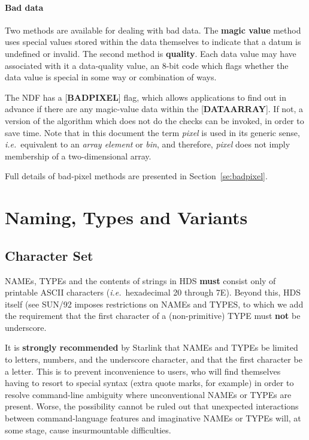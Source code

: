\documentclass[twoside,11pt]{article}
\newcommand{\htmlref}[2]{#1}
\newcommand{\html}[1]{}
\newcommand{\latex}[1]{#1}
\newcommand{\xref}[3]{#1}
\newcommand{\xlabel}[1]{}
\renewcommand{\_}{\texttt{\symbol{95}}}
\begin{document}
\paragraph{Bad data}
Two methods are available for dealing with bad data.  The
{\bf magic value} method uses special values
stored within the data themselves to
indicate that a datum is undefined or invalid.  The second method is
{\bf quality}.  Each data value may have associated with
it a data-quality value, an 8-bit
code which flags whether the data value is special
in some way or combination of ways.

The NDF has a {[}{\bf BAD\_PIXEL}{]} flag, which allows applications
to find out in advance if there are any
magic-value data within the {[}{\bf DATA\_ARRAY}{]}.  If not, a
version of the algorithm which does not do the checks can be
invoked, in order to save time.  Note that in this document the term
{\em pixel} is used in its generic sense, {\it i.e.}\ equivalent to
an {\em array element} or {\em bin}, and therefore, {\em pixel}
does not imply membership of a two-dimensional array.

Full details of bad-pixel methods are presented \latex{in 
Section~\ref{se:badpixel}.}\html{\htmlref{here.}{se:badpixel}}

\section{\xlabel{se_natyvar}Naming, Types and
Variants\label{se:natyvar}}

\subsection{\xlabel{se_charset}Character Set\label{se:charset}}

NAMEs, TYPEs and the contents of strings in HDS
{\bf must} consist only of
printable ASCII characters ({\it i.e.}\ hexadecimal
20 through 7E).  Beyond this, HDS itself
(see \xref{SUN/92}{sun92}) imposes restrictions on NAMEs and TYPES,
to which we add the
requirement that the first character of a
(non-primitive) TYPE must {\bf not} be
underscore.

It is {\bf strongly recommended} by Starlink that NAMEs and TYPEs
be limited to letters, numbers, and the underscore character, and
that the first character be a letter.  This is to
prevent inconvenience
to users, who will find themselves having to resort
to special syntax (extra quote marks, for example) in order to
resolve
command-line ambiguity where unconventional NAMEs or TYPEs are
present.  Worse, the possibility cannot be ruled out that
unexpected interactions
between command-language features and imaginative NAMEs or TYPEs
will, at some stage, cause insurmountable difficulties.
\end{document}
